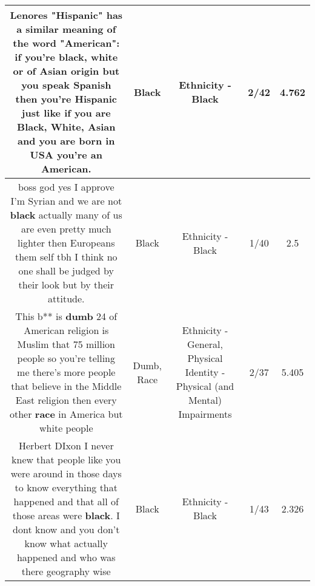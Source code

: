 \documentclass[11pt]{article}
\newlength\mylength
\begin{document}
\begin{center}
\begin{longtable}{|C{.65\mylength}|C{.30\mylength}|C{.12\mylength}|C{.12\mylength}|C{.12\mylength}|}
  \small Lenores "Hispanic" has a similar meaning of the word "American": if you're \textbf{black}, white or of Asian origin but you speak Spanish then you're Hispanic just like if you are \textbf{Black}, White, Asian and you are born in USA you're an American.\normalsize   & Black & Ethnicity - Black & 2/42 & 4.762 \\  \hline
  \small boss god yes I approve I'm Syrian and we are not \textbf{black} actually many of us are even pretty much lighter then Europeans them self tbh I think no one shall be judged by their look but by their attitude.\normalsize   & Black & Ethnicity - Black & 1/40 & 2.5 \\  \hline
  \small This b** is \textbf{dumb} 24 of American religion is Muslim that 75 million people so you're telling me there's more people that believe in the Middle East religion then every other \textbf{race} in America but white people\normalsize   & Dumb, Race & Ethnicity - General, Physical Identity - Physical (and Mental) Impairments & 2/37 & 5.405 \\  \hline
  \small Herbert DIxon I never knew that people like you were around in those days to know everything that happened and that all of those areas were \textbf{black}. I dont know and you don't know what actually happened and  who was there geography wise\normalsize   & Black & Ethnicity - Black & 1/43 & 2.326 \\  \hline

\end{longtable}
\end{center}
\end{document}

